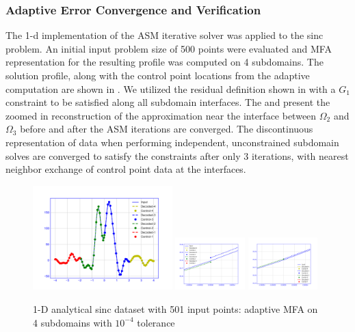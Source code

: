 \subsubsection{Adaptive Error Convergence and Verification}

The 1-d implementation of the ASM iterative solver was applied to the sinc problem. An initial input problem size of 500 points were evaluated and MFA representation for the resulting profile was computed on 4 subdomains. The solution profile, along with the control point locations from the adaptive computation are shown in . We utilized the residual definition shown in  with a $G_1$ constraint to be satisfied along all subdomain interfaces. The  and  present the zoomed in reconstruction of the approximation near the interface between $\Omega_2$ and $\Omega_3$ before and after the ASM iterations are converged. The discontinuous representation of data when performing independent, unconstrained subdomain solves are converged to satisfy the constraints after only 3 iterations, with nearest neighbor exchange of control point data at the interfaces.

\begin{figure}
	\includegraphics[width=0.48\textwidth]{figures/sinc-1d-profile}
	\includegraphics[width=0.24\textwidth]{figures/sinc-1d-discontinuous}
	\includegraphics[width=0.24\textwidth]{figures/sinc-1d-continuous}
	\caption{1-D analytical sinc dataset with 501 input points: adaptive MFA on 4 subdomains with $10^{-4}$ tolerance}
	\label{fig:since-adaptive-1d}
\end{figure}


